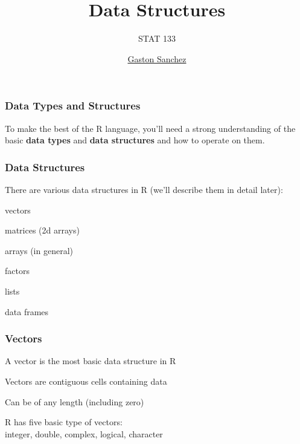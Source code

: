 \documentclass[12pt]{beamer}\usepackage[]{graphicx}\usepackage[]{color}
\title{Data Structures}
\subtitle{STAT 133}
\author{\href{http://www.gastonsanchez.com}{Gaston Sanchez}}
\institute{\href{https://github.com/ucb-stat133/stat133-fall-2016}{\tt \scriptsize \color{foreground} github.com/ucb-stat133/stat133-fall-2016}}
\date{}
\begin{document}
{
  \frame{
    \titlepage
  } 
}


\begin{frame}
\frametitle{Data Types and Structures}

To make the best of the R language, you'll need a strong understanding of the basic \textbf{data types} and \textbf{data structures} and how to operate on them.

\end{frame}


\begin{frame}
\frametitle{Data Structures}

There are various data structures in R (we'll describe them in detail later):

\bi
  \item vectors
  \item matrices (2d arrays)
  \item arrays (in general)
  \item factors
  \item lists
  \item data frames
\ei

\end{frame}


\begin{frame}
\begin{center}
\Huge{}
\end{center}
\end{frame}


\begin{frame}
\frametitle{Vectors}

\bi
  \item A vector is the most basic data structure in R
  \item Vectors are contiguous cells containing data
  \item Can be of any length (including zero)
  \item R has five basic type of vectors: \\
  integer, double, complex, logical, character
\ei

\end{frame}
\end{document}
